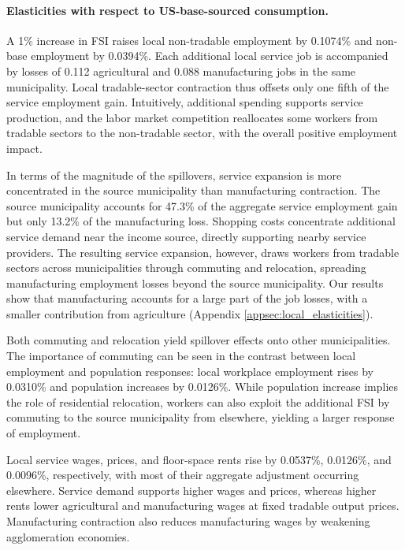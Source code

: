\documentclass[12pt, unicode, a4paper]{article}
\newcommand{\1}{\mbox{1}\hspace{-0.25em}\mbox{l}} %
\begin{document}
\paragraph{Elasticities with respect to US-base-sourced consumption.}
A 1\% increase in FSI raises local non-tradable employment by 0.1074\% and non-base employment by 0.0394\%. Each additional local service job is accompanied by losses of 0.112 agricultural and 0.088 manufacturing jobs in the same municipality. Local tradable-sector contraction thus offsets only one fifth of the service employment gain. Intuitively, additional spending supports service production, and the labor market competition reallocates some workers from tradable sectors to the non-tradable sector, with the overall positive employment impact.

In terms of the magnitude of the spillovers, service expansion is more concentrated in the source municipality than manufacturing contraction. The source municipality accounts for 47.3\% of the aggregate service employment gain but only 13.2\% of the manufacturing loss. 
Shopping costs concentrate additional service demand near the income source, directly supporting nearby service providers. The resulting service expansion, however, draws workers from tradable sectors across municipalities through commuting and relocation, spreading manufacturing employment losses beyond the source municipality.
Our results show that manufacturing accounts for a large part of the job losses, with a smaller contribution from agriculture (Appendix \ref{appsec:local_elasticities}). 

Both commuting and relocation yield spillover effects onto other municipalities. 
The importance of commuting can be seen in the contrast between local employment and population responses: local workplace employment rises by 0.0310\% and population increases by 0.0126\%. While population increase implies the role of residential relocation, workers can also exploit the additional FSI by commuting to the source municipality from elsewhere, yielding a larger response of employment.

Local service wages, prices, and floor-space rents rise by 0.0537\%, 0.0126\%, and 0.0096\%, respectively, with most of their aggregate adjustment occurring elsewhere. Service demand supports higher wages and prices, whereas higher rents lower agricultural and manufacturing wages at fixed tradable output prices. Manufacturing contraction also reduces manufacturing wages by weakening agglomeration economies. 
\end{document}
